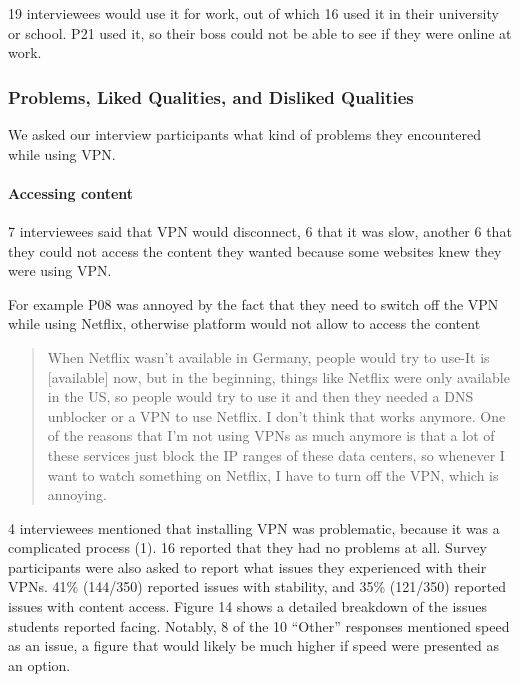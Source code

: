 19 interviewees would use it for work, out of which 16 used it in their
university or school. P21 used it, so their boss could not be able to see if
they were online at work.





\subsubsection{Problems, Liked Qualities, and Disliked Qualities}
We asked our
interview participants what kind of problems they encountered while using VPN.
\paragraph{Accessing content} 7 interviewees said that VPN would disconnect, 6
that it was slow, another 6 that they could not access the content they wanted
because some websites knew they were using VPN. 


For example P08 was annoyed by the fact that they need to switch off the VPN
while using Netflix, otherwise platform would not allow to access the content

\begin{quote}When Netflix wasn't available in Germany, people would try to use-It is [available] now, but in the beginning, things like Netflix were
only available in the US, so people would try to use it and then they needed a
DNS unblocker or a VPN to use Netflix. I don't think that works anymore. One
of the reasons that I'm not using VPNs as much anymore is that a lot of these
services just block the IP ranges of these data centers, so whenever I want to
watch something on Netflix, I have to turn off the VPN, which is annoying.
\end{quote}


4 interviewees mentioned that installing VPN was problematic, because it was a
complicated process (1). 16 reported that they had no problems at all. Survey participants were also asked to report what issues they experienced with
their VPNs. 41\% (144/350) reported issues with stability, and 35\% (121/350)
reported issues with content access. Figure 14 shows a detailed breakdown of
the issues students reported facing. Notably, 8 of the 10 “Other” responses
mentioned speed as an issue, a figure that would likely be much higher if
speed were presented as an option.

